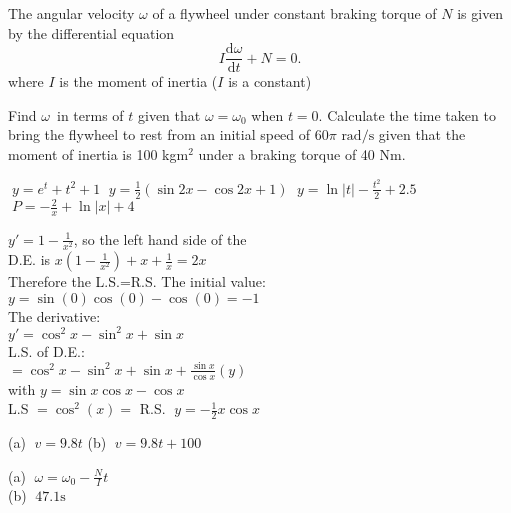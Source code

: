 \begin{Exercise}[title={Differential Equations},label=exDiffEqns]
\Question The angular velocity
$\omega $ of a flywheel under constant braking torque of $N$ is given by the differential equation
\begin{equation*}I \frac{\mathrm{d} \omega }{\mathrm{d} t} +N =0.
\end{equation*}where $I$ is the moment of inertia ($I$ is a constant) 
\begin{tasks}
	\task Find $\omega $\ in terms of $t$ given that $\omega  =\omega _{0}$ when $t =0$. 	
	\task Calculate the time taken to bring the flywheel to rest from an initial speed of $60 \pi  \text{ rad/s}$ given that the moment of inertia is 100 kgm$^2$ under a braking torque of 40 Nm.
\end{tasks}

\end{Exercise}
\begin{Answer}[ref={exDiffEqns}]
\Question %
\begin{tasks}
	\task $\;y =e^{t} +t^{2} +1$ 
	\task $\;y =\frac{1}{2} \left (\sin  2 x -\cos  2 x +1\right )$
	\task $\;y =\ln|t|  -\frac{t^{2}}{2} +2.5$ 
	\task $\;P = -\frac{2}{x} +\ln  \left \vert x\right \vert  +4$ 
\end{tasks}

\Question %
$y'=1-\frac{1}{x^2}$, so the left hand side of the \\ D.E. is $x(1-\frac{1}{x^2})+x+\frac{1}{x}=2x$ \\Therefore the L.S.=R.S.
\Question %
The initial value:\\
$y=\sin(0)\cos(0)-\cos(0)=-1$\\
The derivative:\\
$y'=\cos^2 x-\sin^2 x+\sin x$\\
L.S. of D.E.:\\
$=\cos^2 x-\sin^2 x +\sin x +\frac{\sin x}{\cos x}(y)$\\
with $y=\sin  x \cos  x -\cos  x$\\
L.S $=\cos^2(x)=$ R.S.
\Question %
$\;y = -\frac{1}{2} x \cos  x$

\Question %
(a) $\;v =9.8 t$ (b) $\;v =9.8 t +100$

\Question %
(a) $\;\omega  =\omega _{0} -\frac{N}{I} t$ \\
(b) $\;47.1 \mbox{s}$
\end{Answer}%
